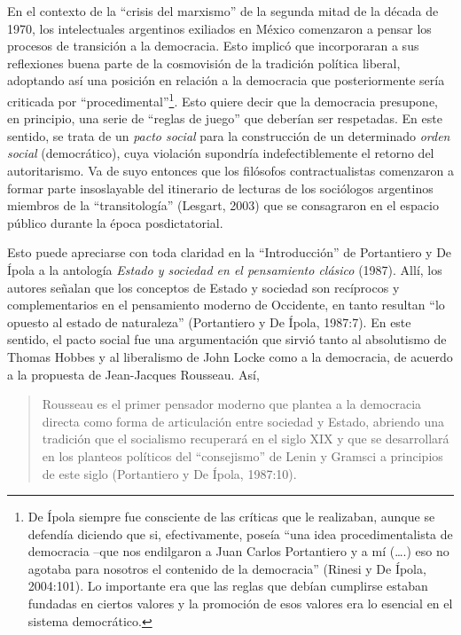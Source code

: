 En el contexto de la ``crisis del marxismo'' de la segunda mitad de la década de 1970, los intelectuales argentinos exiliados en México comenzaron a pensar los procesos de transición a la democracia. Esto implicó que incorporaran a sus reflexiones buena parte de la cosmovisión de la tradición política liberal, adoptando así una posición en relación a la democracia que posteriormente sería criticada por ``procedimental''\footnote{De Ípola siempre fue consciente de las críticas que le realizaban, aunque se defendía diciendo que si, efectivamente, poseía ``una idea procedimentalista de democracia --que nos endilgaron a Juan Carlos Portantiero y a mí (\ldots.) eso no agotaba para nosotros el contenido de la democracia'' (Rinesi y De Ípola, 2004:101). Lo importante era que las reglas que debían cumplirse estaban fundadas en ciertos valores y la promoción de esos valores era lo esencial en el sistema democrático.}. Esto quiere decir que la democracia presupone, en principio, una serie de ``reglas de juego'' que deberían ser respetadas. En este sentido, se trata de un \emph{pacto social} para la construcción de un determinado \emph{orden social} (democrático), cuya violación supondría indefectiblemente el retorno del autoritarismo. Va de suyo entonces que los filósofos contractualistas comenzaron a formar parte insoslayable del itinerario de lecturas de los sociólogos argentinos miembros de la ``transitología'' (Lesgart, 2003) que se consagraron en el espacio público durante la época posdictatorial.

Esto puede apreciarse con toda claridad en la ``Introducción'' de Portantiero y De Ípola a la antología \emph{Estado y sociedad en el pensamiento clásico} (1987). Allí, los autores señalan que los conceptos de Estado y sociedad son recíprocos y complementarios en el pensamiento moderno de Occidente, en tanto resultan ``lo opuesto al estado de naturaleza'' (Portantiero y De Ípola, 1987:7). En este sentido, el pacto social fue una argumentación que sirvió tanto al absolutismo de Thomas Hobbes y al liberalismo de John Locke como a la democracia, de acuerdo a la propuesta de Jean-Jacques Rousseau. Así,

\begin{quote}
Rousseau es el primer pensador moderno que plantea a la democracia directa como forma de articulación entre sociedad y Estado, abriendo una tradición que el socialismo recuperará en el siglo XIX y que se desarrollará en los planteos políticos del ``consejismo'' de Lenin y Gramsci a principios de este siglo (Portantiero y De Ípola, 1987:10).
\end{quote}

